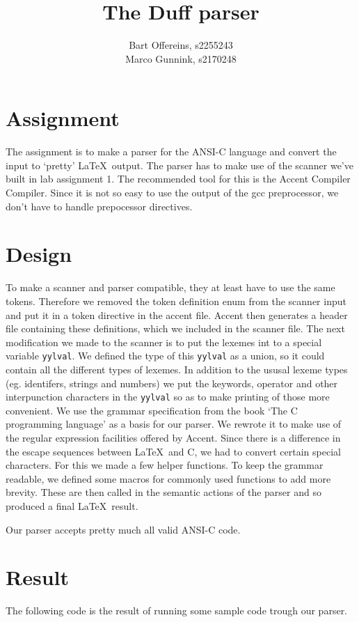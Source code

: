 \documentclass{article}
\title{The Duff parser}
\author{Bart Offereins, s2255243\\ Marco Gunnink, s2170248}
\begin{document}
\maketitle

\section*{Assignment}

The assignment is to make a parser for the ANSI-C language and convert the input to `pretty' \LaTeX \ output. The parser has to make use of the scanner we've built in lab assignment 1. The recommended tool for this is the Accent Compiler Compiler. Since it is not so easy to use the output of the gcc preprocessor, we don't have to handle prepocessor directives. 

\section*{Design}

To make a scanner and parser compatible, they at least have to use the same tokens. Therefore we removed the token definition enum from the scanner input and put it in a token directive in the accent file. Accent then generates a header file containing these definitions, which we included in the scanner file. The next modification we made to the scanner is to put the lexemes int to a special variable \lstinline{yylval}. We defined the type of this \lstinline{yylval} as a union, so it could contain all the different types of lexemes. In addition to the ususal lexeme types (eg. identifers, strings and numbers) we put the keywords, operator and other interpunction characters in the \lstinline{yylval} so as to make printing of those more convenient. We use the grammar specification from the book `The C programming language' as a basis for our parser. We rewrote it to make use of the regular expression facilities offered by Accent.
Since there is a difference in the escape sequences between \LaTeX \ and C, we had to convert certain special characters. For this we made a few helper functions. To keep the grammar readable, we defined some macros for commonly used functions to add more brevity. These are then called in the semantic actions of the parser and so produced a final \LaTeX \ result.

Our parser accepts pretty much all valid ANSI-C code.

\section*{Result}

The following code is the result of running some sample code trough our parser.


\end{document}

